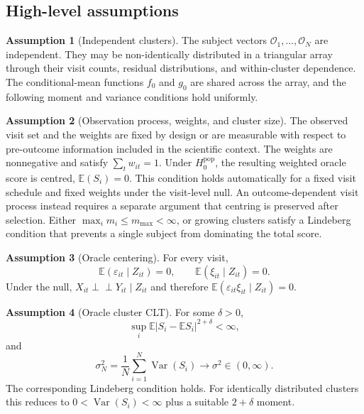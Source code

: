 \documentclass[11pt]{article}
\theoremstyle{definition}
\newtheorem{assumption}{Assumption}[section]
\newcommand{\indep}{\perp\!\!\!\perp}
\newcommand{\E}{\mathbb{E}}
\newcommand{\Var}{\operatorname{Var}}
\begin{document}
\subsection{High-level assumptions}

\begin{assumption}[Independent clusters]
\label{ass:clusters}
The subject vectors $\mathcal O_1,\ldots,\mathcal O_N$ are independent. They may be
non-identically distributed in a triangular array through their visit counts, residual
distributions, and within-cluster dependence. The conditional-mean functions $f_0$ and $g_0$
are shared across the array, and the following moment and variance conditions hold uniformly.
\end{assumption}

\begin{assumption}[Observation process, weights, and cluster size]
\label{ass:weights}
The observed visit set and the weights are fixed by design or are measurable with respect to
pre-outcome information included in the scientific context. The weights are nonnegative and
satisfy $\sum_t w_{it}=1$. Under $H_0^{\mathrm{pop}}$, the resulting weighted oracle score is
centred, $\E(S_i)=0$. This condition holds automatically for a fixed visit schedule and fixed
weights under the visit-level null. An outcome-dependent visit process instead requires a
separate argument that centring is preserved after selection. Either
$\max_i m_i\leq m_{\max}<\infty$, or growing clusters satisfy a Lindeberg condition that
prevents a single subject from dominating the total score.
\end{assumption}

\begin{assumption}[Oracle centering]
\label{ass:centering}
For every visit,
\[
\E(\varepsilon_{it}\mid Z_{it})=0,
\qquad
\E(\xi_{it}\mid Z_{it})=0.
\]
Under the null, $X_{it}\indep Y_{it}\mid Z_{it}$ and therefore
$\E(\varepsilon_{it}\xi_{it}\mid Z_{it})=0$.
\end{assumption}

\begin{assumption}[Oracle cluster CLT]
\label{ass:oracle-clt}
For some $\delta>0$,
\[
\sup_i\E|S_i-\E S_i|^{2+\delta}<\infty,
\]
and
\[
\sigma_N^2=\frac1N\sum_{i=1}^N\Var(S_i)
\longrightarrow \sigma^2\in(0,\infty).
\]
The corresponding Lindeberg condition holds. For identically distributed clusters this
reduces to $0<\Var(S_i)<\infty$ plus a suitable $2+\delta$ moment.
\end{assumption}
\end{document}
